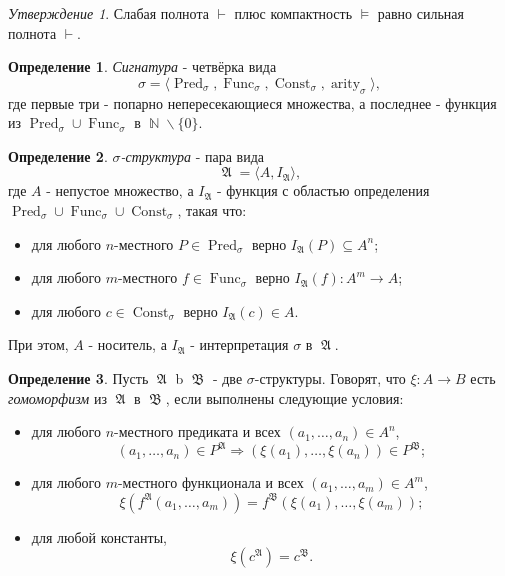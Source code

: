 \documentclass[a4paper,100pt]{article}
\theoremstyle{indented}
\theoremstyle{definition}
\newtheorem{defn}{Определение}
\theoremstyle{remark}
\newtheorem{stat}{Утверждение}
\DeclareMathOperator{\ra}{\rightarrow}
\DeclareMathOperator{\Ra}{\Rightarrow}
\DeclareMathOperator{\NN}{\mathbb{N}}
\DeclareMathOperator{\Pred}{Pred}
\DeclareMathOperator{\Func}{Func}
\DeclareMathOperator{\Const}{Const}
\DeclareMathOperator{\arity}{arity}
\DeclareMathOperator{\GA}{\mathfrak{A}}
\DeclareMathOperator{\GB}{\mathfrak{B}}
\begin{document}
\begin{stat}
  Слабая полнота $\vdash$ плюс компактность $\vDash$ равно сильная полнота $\vdash$. 
\end{stat}

\begin{defn}
  \textit{Сигнатура} - четвёрка вида 
  \[
    \sigma = \langle \Pred_\sigma, \Func_\sigma, \Const_\sigma, \arity_\sigma \rangle,
  \]
  где первые три - попарно непересекающиеся множества, а последнее - функция из $\Pred_\sigma \cup \Func_\sigma$ в $\NN\backslash \{0\}$. 
\end{defn}

\begin{defn}
  \textit{$\sigma$-структура} - пара вида 
  \[
    \GA = \langle A, I_{\GA}\rangle, 
  \]
  где $A$ - непустое множество, а $I_{\GA}$ - функция с областью определения $\Pred_\sigma \cup \Func_\sigma \cup \Const_\sigma$, такая что:

  \begin{itemize}
    \item для любого $n$-местного $P\in \Pred_\sigma$ верно $I_{\GA}(P)\subseteq A^n$; 
    \item для любого $m$-местного $f\in \Func_\sigma$ верно $I_{\GA}(f):A^m\ra A$; 
    \item для любого $c\in\Const_\sigma$ верно $I_{\GA}(c)\in A$. 
  \end{itemize}

  При этом, $A$ - носитель, а $I_{\GA}$ - интерпретация $\sigma$ в $\GA$. 
\end{defn}

\begin{defn}
  Пусть $\GA$ b $\GB$ - две $\sigma$-структуры. Говорят, что $\xi: A\ra B$ есть \textit{гомоморфизм} из $\GA$ в $\GB$, если выполнены следующие условия:

  \begin{itemize}
    \item для любого $n$-местного предиката и всех $(a_1, \ldots, a_n)\in A^n$, 
    \[
      (a_1, \ldots, a_n)\in P^{\GA} \Ra (\xi(a_1), \ldots, \xi(a_n)) \in P^{\GB}; 
    \]
    \item для любого $m$-местного функционала и всех $(a_1, \ldots, a_m)\in A^m$, 
    \[
      \xi(f^{\GA}(a_1, \ldots, a_m))=f^{\GB}(\xi(a_1), \ldots, \xi(a_m)); 
    \]
    \item для любой константы, 
    \[
      \xi(c^{\GA})=c^{\GB}.
    \]
  \end{itemize}
\end{defn}
\end{document}
